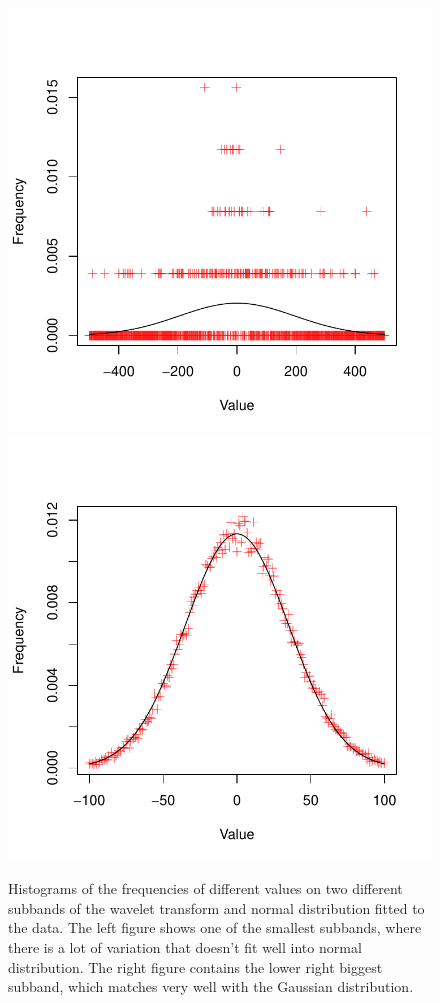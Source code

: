 \documentclass{article}
\begin{document}
\begin{figure}
    \includegraphics[scale=0.5]{histo1}
    \includegraphics[scale=0.5]{histo15}
    \caption{Histograms of the frequencies of different values on two different subbands of the wavelet transform and normal distribution fitted to the data. The left figure shows one of the smallest subbands, where there is a lot of variation that doesn't fit well into normal distribution. The right figure contains the lower right biggest subband, which matches very well with the Gaussian distribution.}\label{fig:histo}
\end{figure}
\end{document}
